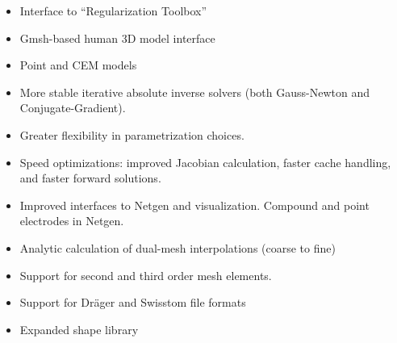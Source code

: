 \documentclass[10pt,letterpaper]{article}
\begin{document}
\begin{multicols}{2}
\begin{itemize}
\item Interface to ``Regularization Toolbox'' \cite{hansen2007}

\item Gmsh-based human 3D model interface \cite{grychtol2016}

\item Point and CEM models


\item More stable
  iterative absolute inverse solvers (both Gauss-Newton and
  Conjugate-Gradient).

\item Greater flexibility in parametrization choices.


\item Speed optimizations: improved Jacobian calculation, faster cache handling, and 
  faster forward solutions.


\item Improved interfaces to Netgen and visualization.
      Compound and point electrodes in Netgen.

\item Analytic calculation of dual-mesh interpolations (coarse to fine)

\item Support for second and third order mesh elements.

\item Support for Dr\"ager and Swisstom file formats

\item Expanded shape library
\end{itemize}


\end{multicols}
\end{document}
